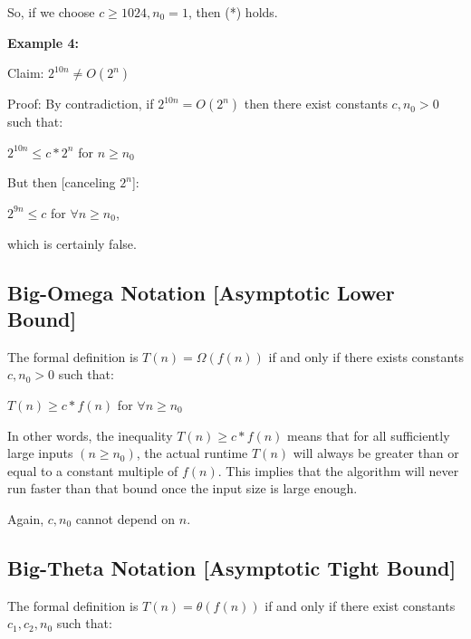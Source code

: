 \documentclass[11pt]{article}
\begin{document}
So, if we choose $c \geq 1024,n_0=1$, then (*) holds.

\vspace{11pt}
\textbf{Example 4:}

Claim: $2^{10n} \neq O(2^n)$

Proof: By contradiction, if $2^{10n}=O(2^n)$ then there exist constants $c,n_0 > 0$ such that:

\vspace{11pt}
\begin{center}
    $2^{10n} \leq c*2^n$ for $n \geq n_0$

    But then [canceling $2^n$]:

    $2^{9n} \leq c$ for $\forall n \geq n_0$,

    which is certainly false.
\end{center}
\vspace{11pt}

\newpage
\subsection{Big-Omega Notation [Asymptotic Lower Bound]}
\vspace{11pt}

The formal definition is $T(n)=\Omega(f(n))$ if and only if there exists constants $c,n_0 > 0$ such that:

\vspace{11pt}
\begin{center}
    $T(n) \geq c *f(n)$ for $\forall n \geq n_0$
\end{center}
\vspace{11pt}

In other words, the inequality $T(n) \geq c * f(n)$ means that for all sufficiently large inputs $(n \geq n_0)$, the actual runtime $T(n)$ will always be greater than or equal to a constant multiple of $f(n)$. This implies that the algorithm will never run faster than that bound once the input size is large enough.

Again, $c,n_0$ cannot depend on $n$.

\vspace{11pt}
\subsection{Big-Theta Notation [Asymptotic Tight Bound]}
\vspace{11pt}

The formal definition is $T(n)=\theta(f(n))$ if and only if there exist constants $c_1,c_2,n_0$ such that:
\end{document}
